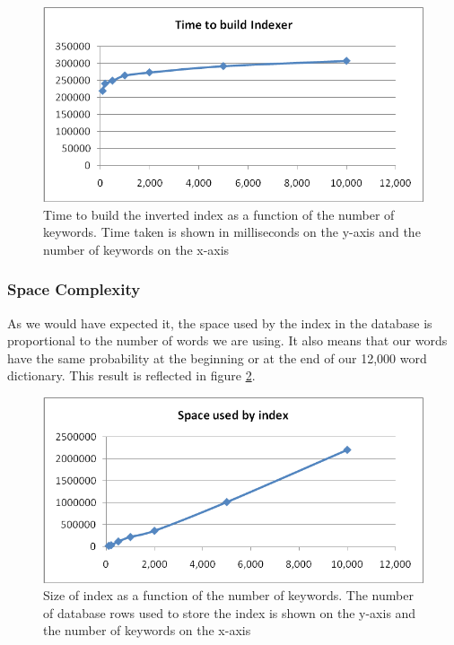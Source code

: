 \documentclass[10pt]{article}
\begin{document}
\begin{itemize}
  \begin{figure}[h]
    \begin{center}
      \includegraphics[width=\textwidth,height=!]{numkeywordstimecomplexbuildindex}
    \end{center}
    \caption{Time to build the inverted index as a function of the
      number of keywords. Time taken is shown in milliseconds on the
      y-axis and the number of keywords on the x-axis}
    \label{fig:numkeywordstimecomplexbuildindex}
  \end{figure} 

\end{itemize}


\subsubsection{Space Complexity}
As we would have expected it, the space used by the index in the
database is proportional to the number of words we are using. It also
means that our words have the same probability at the beginning or at
the end of our 12,000 word dictionary. This result is reflected in
figure \ref{fig:numkeywordsspacecomplexbuildindex}.

\begin{figure}
  \begin{center}
    \includegraphics[width=\textwidth,height=!]{numkeywordsspacecomplexbuildindex}
  \end{center}
    \caption{Size of index as a function of the number of
      keywords. The number of database rows used to store the index is
      shown on the y-axis and the number of keywords on the x-axis} 
    \label{fig:numkeywordsspacecomplexbuildindex}
\end{figure} 
\end{document}
